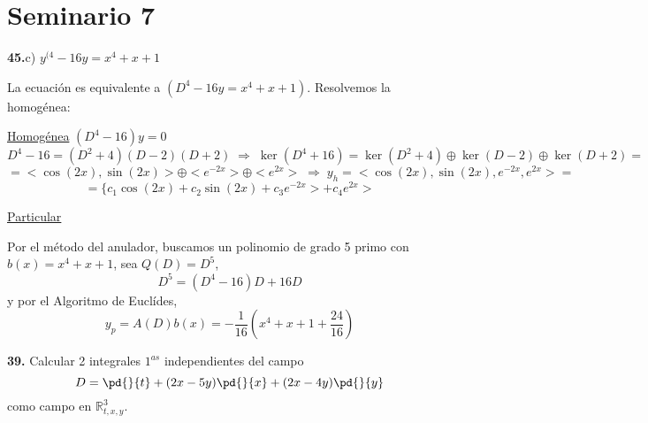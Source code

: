 \section{Seminario 7}
\begin{ejer}
    \textbf{45.}c) $y^{(4} - 16y = x^4+x+1$
\end{ejer}
\begin{sol}
    La ecuación es equivalente a $(D^4-16y=x^4+x+1)$. Resolvemos la homogénea:

    \underline{Homogénea} $(D^4-16)y=0$
    $$D^4-16=(D^2+4)(D-2)(D+2) \; \Rightarrow \; \ker (D^4 +16)=\ker (D^2+4) \oplus \ker (D-2) \oplus \ker(D+2)=$$
    $$=<\cos(2x),\sin(2x)>\oplus <e^{-2x}> \oplus <e^{2x}> \;\Rightarrow \; y_h=<\cos(2x),\sin(2x) , e^{-2x} , e^{2x}> =$$
    $$=\{ c_1 \cos(2x) + c_2 \sin(2x) +c_3 e^{-2x}> +c_4 e^{2x}>$$

    \underline{Particular}

    Por el método del anulador, buscamos un polinomio de grado 5 primo con $b(x)=x^4+x+1$, sea $Q(D)=D^5$, 
    $$D^5=(D^4-16)D + 16D$$
    y por el Algoritmo de Euclídes, 
    $$y_p=A(D)b(x)=-\dfrac{1}{16}\left(x^4+x+1+\dfrac{24}{16} \right)$$
\end{sol}
\begin{ejer} \textbf{39.}
    Calcular 2 integrales $1^{as}$ independientes del campo
    $$D=\pd{}{t}+(2x-5y)\pd{}{x}+(2x-4y)\pd{}{y}$$
    como campo en $\mathbb R^3_{t,x,y}$.
\end{ejer}

